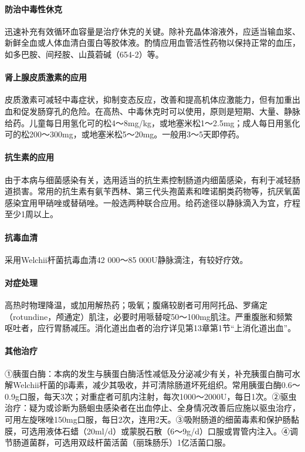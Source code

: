 \paragraph{防治中毒性休克}

迅速补充有效循环血容量是治疗休克的关键。除补充晶体溶液外，应适当输血浆、新鲜全血或人体血清白蛋白等胶体液。酌情应用血管活性药物以保持正常的血压，如多巴胺、间羟胺、山莨菪碱（654-2）等。

\paragraph{肾上腺皮质激素的应用}

皮质激素可减轻中毒症状，抑制变态反应，改善和提高机体应激能力，但有加重出血和促发肠穿孔的危险。在高热、中毒休克时可以使用，原则是短期、大量、静脉给药。儿童每日用氢化可的松4～8mg/kg，或地塞米松1～2.5mg；成人每日用氢化可的松200～300mg，或地塞米松5～20mg。一般用3～5天即停药。

\paragraph{抗生素的应用}

由于本病与细菌感染有关，选用适当的抗生素控制肠道内细菌感染，有利于减轻肠道损害。常用的抗生素有氨苄西林、第三代头孢菌素和喹诺酮类药物等，抗厌氧菌感染宜用甲硝唑或替硝唑。一般选两种联合应用。给药途径以静脉滴入为宜，疗程至少1周以上。

\paragraph{抗毒血清}

采用Welchii杆菌抗毒血清42 000～85 000U静脉滴注，有较好疗效。

\paragraph{对症处理}

高热时物理降温，或加用解热药；吸氧；腹痛较剧者可用阿托品、罗痛定（rotundine，颅通定）肌注，必要时用哌替啶50～100mg肌注。严重腹胀和频繁呕吐者，应行胃肠减压。消化道出血者的治疗详见第13章第1节“上消化道出血”。

\paragraph{其他治疗}

①胰蛋白酶：本病的发生与胰蛋白酶活性减低及分泌减少有关，补充胰蛋白酶可水解Welchii杆菌的β毒素，减少其吸收，并可清除肠道坏死组织。常用胰蛋白酶0.6～0.9g口服，每天3次；对重症者可肌内注射，每次1000～2000U，每日1次。②驱虫治疗：疑为或诊断为肠蛔虫感染者在出血停止、全身情况改善后应施以驱虫治疗，可用左旋咪唑150mg口服，每日2次，连用2天。③吸附肠道的细菌毒素和保护肠黏膜，可选用液体石蜡（20ml/d）或蒙脱石散（6～9g/d）口服或胃管内注入。④调节肠道菌群，可选用双歧杆菌活菌（丽珠肠乐）1亿活菌口服。

